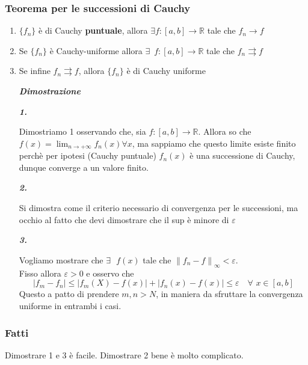 \documentclass{article}
\theoremstyle{definition}
\newcommand{\R}{\mathbb{R}}
\begin{document}
\subsubsection{Teorema per le successioni di Cauchy}
\begin{enumerate}
    \item $\{f_n\}$ è di Cauchy \textbf{puntuale}, allora $\exists f: [a,b] \to \R$ tale che $f_n \to f$
    \item Se $\{f_n\}$ è Cauchy-uniforme allora $\exists \,\,\, f:[a,b] \to \R$ tale che $f_n \rightrightarrows f$
    \item Se infine $f_n \rightrightarrows f$, allora $\{f_n\}$ è di Cauchy uniforme
    \begin{center}
        \textbf{\textit{Dimostrazione}}
    \end{center}
    \begin{center}
        \textbf{\textit{1.}}
    \end{center}
Dimostriamo 1 osservando che, sia $f:[a,b] \to \R$. Allora so che $f(x)=\lim_{n \to +\infty}f_n(x) \forall x$, ma sappiamo che questo limite esiste finito perchè per ipotesi (Cauchy puntuale) $f_n(x)$ è una successione di Cauchy, dunque converge a un valore finito.
\begin{center}
    \textbf{\textit{2.}}
\end{center}
Si dimostra come il criterio necessario di convergenza per le successioni, ma occhio al fatto che devi dimostrare che il sup è minore di $\varepsilon$







\begin{center}
    \textbf{\textit{3.}}
\end{center}
Vogliamo mostrare che $\exists \,\,\,\, f(x)$ tale che $\left\|f_n-f\right\|_\infty < \varepsilon$.
\\
Fisso allora $ \varepsilon > 0$ e osservo che
\begin{equation}
    \left|f_m-f_n\right| \leqslant \left|f_m(X)-f(x)\right|+\left|f_n(x)-f(x)\right| \leqslant \varepsilon \,\,\,\,\,\, \forall \,\, x \in [a,b]
\end{equation}
Questo a patto di prendere $m,n>N$, in maniera da sfruttare la convergenza uniforme in entrambi i casi.


\end{enumerate}
\subsubsection{Fatti}
Dimostrare 1 e 3 è facile. Dimostrare 2 bene è molto complicato.
\end{document}
